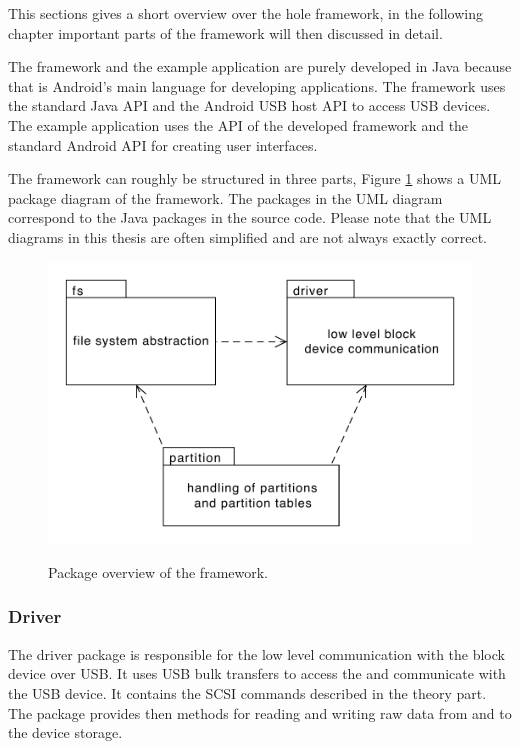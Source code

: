 This sections gives a short overview over the hole framework, in the following chapter important parts of the framework will then discussed in detail.

The framework and the example application are purely developed in Java because that is Android's main language for developing applications. The framework uses the standard Java API and the Android USB host API to access USB devices. The example application uses the API of the developed framework and the standard Android API for creating user interfaces.

The framework can roughly be structured in three parts, Figure \ref{figure:package} shows a UML package diagram of the framework. The packages in the UML diagram correspond to the Java packages in the source code. Please note that the UML diagrams in this thesis are often simplified and are not always exactly correct.

\begin{figure}[h!]
\caption{Package overview of the framework.}
\centering
\includegraphics[scale=0.9]{figures/package}
\label{figure:package}
\end{figure}

\subsubsection{Driver}

The driver package is responsible for the low level communication with the block device over USB. It uses USB bulk transfers to access the and communicate with the USB device. It contains the SCSI commands described in the theory part. The package provides then methods for reading and writing raw data from and to the device storage.

